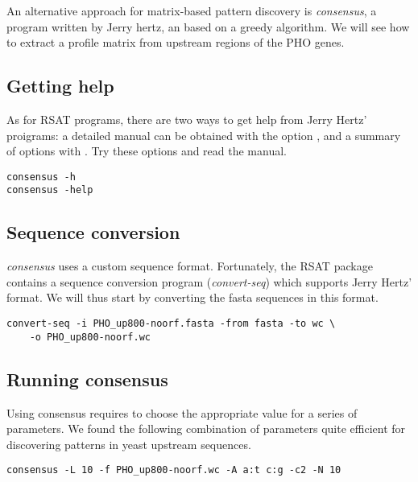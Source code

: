 An alternative approach for matrix-based pattern discovery is
\textit{consensus}, a program written by Jerry hertz, an based on a
greedy algorithm. We will see how to extract a profile matrix from
upstream regions of the PHO genes.

\subsection{Getting help}

As for RSAT programs, there are two ways to get help from Jerry Hertz'
proigrams: a detailed manual can be obtained with the option
, and a summary of options with . Try these
options and read the manual.

{\color{Blue} \begin{footnotesize} 
\begin{verbatim}
consensus -h
consensus -help
\end{verbatim} \end{footnotesize}
}


\subsection{Sequence conversion}


\textit{consensus} uses a custom sequence format. Fortunately, the RSAT
package contains a sequence conversion program (\textit{convert-seq})
which supports Jerry Hertz' format. We will thus start by converting
the fasta sequences in this format. 

{\color{Blue} \begin{footnotesize} 
\begin{verbatim}
convert-seq -i PHO_up800-noorf.fasta -from fasta -to wc \ 
    -o PHO_up800-noorf.wc
\end{verbatim} \end{footnotesize}
}


\subsection{Running consensus}

Using consensus requires to choose the appropriate value for a series
of parameters. We found the following combination of parameters quite
efficient for discovering patterns in yeast upstream sequences.

{\color{Blue} \begin{footnotesize} 
\begin{verbatim}
consensus -L 10 -f PHO_up800-noorf.wc -A a:t c:g -c2 -N 10
\end{verbatim} \end{footnotesize}
}


